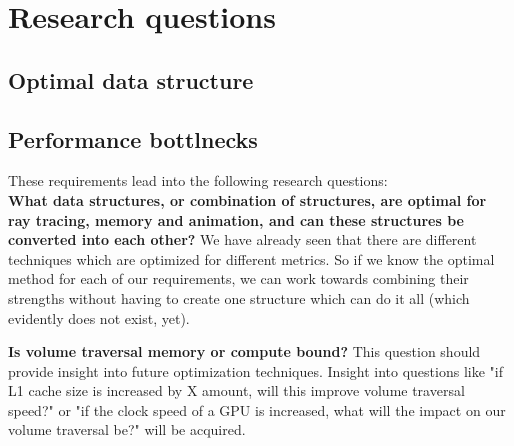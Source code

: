 \section{Research questions}\label{research_questions}
\subsection{Optimal data structure}\label{research_questions:optimal_data_structure}
\subsection{Performance bottlnecks}\label{research_questions:performance_bottlenecks}

These requirements lead into the following research questions:\\

\noindent\textbf{What data structures, or combination of structures, are optimal for ray tracing, memory and animation, and can these structures be converted into each other?} We have already seen that there are different techniques which are optimized for different metrics. So if we know the optimal method for each of our requirements, we can work towards combining their strengths without having to create one structure which can do it all (which evidently does not exist, yet).

\noindent\textbf{Is volume traversal memory or compute bound?} This question should provide insight into future optimization techniques. Insight into questions like "if L1 cache size is increased by X amount, will this improve volume traversal speed?" or "if the clock speed of a GPU is increased, what will the impact on our volume traversal be?" will be acquired.

